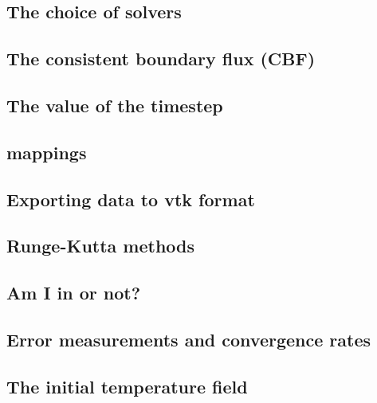 \documentclass[a4paper]{article}
\begin{document}
\subsection{The choice of solvers\label{sec_solvers}}  %
\newpage %
\subsection{The consistent boundary flux (CBF)}  %
\newpage %
\subsection{The value of the timestep}  %
\newpage %
\subsection{mappings}  %
\newpage %
\subsection{Exporting data to vtk format}  %
\newpage %
\subsection{Runge-Kutta methods}  %
\newpage %
\subsection{Am I in or not?}  %
\newpage %
\subsection{Error measurements and convergence rates}  %
\newpage %
\subsection{The initial temperature field}  %
\newpage %
\end{document}
